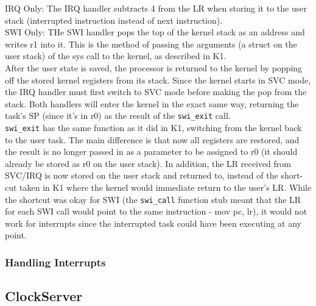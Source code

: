 \documentclass[12pt]{article}
\begin{document}
IRQ Only: The IRQ handler subtracts 4 from the LR when storing it to the user stack (interrupted instruction instead of next instruction).
\\
SWI Only: THe SWI handler pops the top of the kernel stack as an address and writes r1 into it. This is the method of passing the arguments (a struct on the user stack) of the sys call to the kernel, as described in K1.
\\
After the user state is saved, the processor is returned to the kernel by popping off the stored kernel registers from its stack. Since the kernel starts in SVC mode, the IRQ handler must first switch to SVC mode before making the pop from the stack. Both handlers will enter the kernel in the exact same way, returning the task's SP (since it's in r0) as the result of the \texttt{swi\_exit} call.
\\
\texttt{swi\_exit} has the same function as it did in K1, switching from the kernel back to the user task. The main difference is that now all registers are restored, and the result is no longer passed in as a parameter to be assigned to r0 (it should already be stored as r0 on the user stack). In addition, the LR received from SVC/IRQ is now stored on the user stack and returned to, instead of the short-cut taken in K1 where the kernel would immediate return to the user's LR. While the shortcut was okay for SWI (the \texttt{swi\_call} function stub meant that the LR for each SWI call would point to the same instruction - mov pc, lr), it would not work for interrupts since the interrupted task could have been executing at any point.

\subsubsection{Handling Interrupts}


\subsection{ClockServer}
\end{document}
